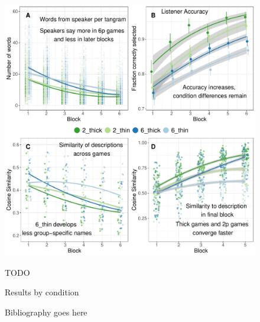 \documentclass[11pt,a4paper]{article}
\begin{document}
\begin{figure}
	\includegraphics[width=\textwidth]{../images/CAMP1.pdf}
	\caption{Results by condition}{TODO}
\end{figure}

\begin{figure} Bibliography goes here \end{figure}
\end{document}
